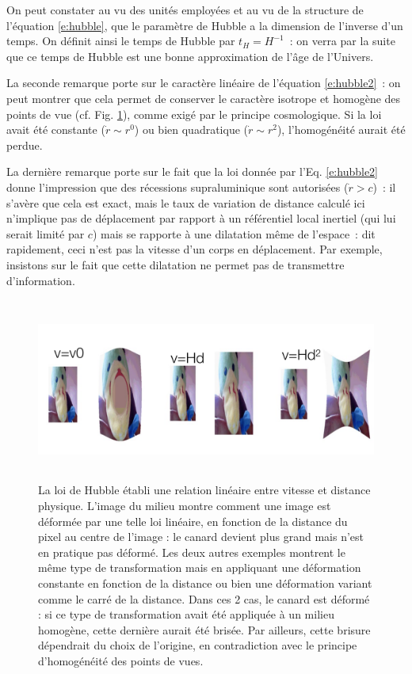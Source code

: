 On peut constater au vu des unités employées et au vu de la structure de l'équation \ref{e:hubble}, que le paramètre de Hubble a la dimension de l'inverse d'un temps. On définit ainsi le temps de Hubble par $t_H=H^{-1}$~: on verra par la suite que ce temps de Hubble est une bonne approximation de l'âge de l'Univers. 

La seconde remarque porte sur le caractère linéaire de l'équation \ref{e:hubble2}~: on peut montrer que cela permet de conserver le caractère isotrope et homogène des points de vue (cf. Fig. \ref{f:canard}), comme exigé par le principe cosmologique. Si la loi avait été constante ($\dot r \sim r^0$) ou bien quadratique ($\dot r\sim r^2$), l'homogénéité aurait été perdue. 

La dernière remarque porte sur le fait que la loi donnée par l'Eq. \ref{e:hubble2} donne l'impression que des récessions supraluminique sont autorisées ($\dot r>c$)~: il s'avère que cela est exact, mais le taux de variation de distance calculé ici n'implique pas de déplacement par rapport à un référentiel local inertiel (qui lui serait limité par $c$) mais se rapporte à une dilatation  même de l'espace~: dit rapidement, ceci n'est pas la vitesse d'un corps en déplacement. Par exemple, insistons sur le fait que cette dilatation ne permet pas de transmettre d'information.

\begin{figure}[htbp]
	\centering
		\includegraphics[height=6cm]{figs/canard.png}
	\caption[loi de Hubble et homogénéité]{La loi de Hubble établi une relation linéaire entre vitesse et distance physique. L'image du milieu montre comment une image est déformée par une telle loi linéaire, en fonction de la distance du pixel au centre de l'image : le canard devient plus grand mais n'est en pratique pas déformé. Les deux autres exemples montrent le même type de transformation mais en appliquant une déformation constante en fonction de la distance ou bien une déformation variant comme le carré de la distance. Dans ces 2 cas, le canard est déformé : si ce type de transformation avait été appliquée à un milieu homogène, cette dernière aurait été brisée. Par ailleurs, cette brisure dépendrait du choix de l'origine, en contradiction avec le principe d'homogénéité des points de vues.}
	\label{f:canard}
\end{figure}

